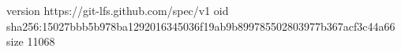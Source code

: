 version https://git-lfs.github.com/spec/v1
oid sha256:15027bbb5b978ba1292016345036f19ab9b899785502803977b367acf3c44a66
size 11068
